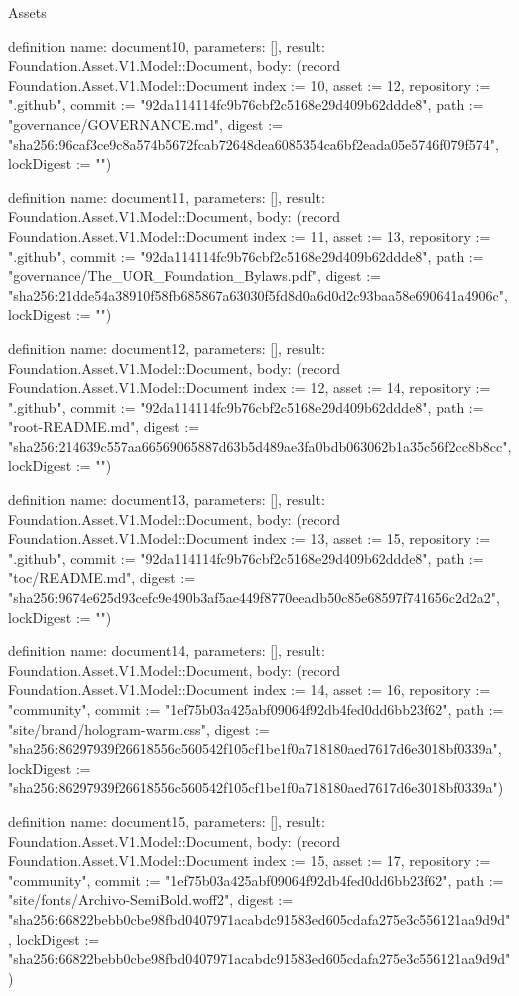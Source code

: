 \begin{lexlean}{Assets}
\begin{semanticmodule}
definition{
  name: document10,
  parameters: [],
  result: Foundation.Asset.V1.Model::Document,
  body: (record Foundation.Asset.V1.Model::Document {index := 10, asset := 12, repository := ".github", commit := "92da114114fc9b76cbf2c5168e29d409b62ddde8", path := "governance/GOVERNANCE.md", digest := "sha256:96caf3ce9c8a574b5672fcab72648dea6085354ca6bf2eada05e5746f079f574", lockDigest := ""})
}

definition{
  name: document11,
  parameters: [],
  result: Foundation.Asset.V1.Model::Document,
  body: (record Foundation.Asset.V1.Model::Document {index := 11, asset := 13, repository := ".github", commit := "92da114114fc9b76cbf2c5168e29d409b62ddde8", path := "governance/The_UOR_Foundation_Bylaws.pdf", digest := "sha256:21dde54a38910f58fb685867a63030f5fd8d0a6d0d2c93baa58e690641a4906c", lockDigest := ""})
}

definition{
  name: document12,
  parameters: [],
  result: Foundation.Asset.V1.Model::Document,
  body: (record Foundation.Asset.V1.Model::Document {index := 12, asset := 14, repository := ".github", commit := "92da114114fc9b76cbf2c5168e29d409b62ddde8", path := "root-README.md", digest := "sha256:214639c557aa66569065887d63b5d489ae3fa0bdb063062b1a35c56f2cc8b8cc", lockDigest := ""})
}

definition{
  name: document13,
  parameters: [],
  result: Foundation.Asset.V1.Model::Document,
  body: (record Foundation.Asset.V1.Model::Document {index := 13, asset := 15, repository := ".github", commit := "92da114114fc9b76cbf2c5168e29d409b62ddde8", path := "toc/README.md", digest := "sha256:9674e625d93cefc9e490b3af5ae449f8770eeadb50c85e68597f741656c2d2a2", lockDigest := ""})
}

definition{
  name: document14,
  parameters: [],
  result: Foundation.Asset.V1.Model::Document,
  body: (record Foundation.Asset.V1.Model::Document {index := 14, asset := 16, repository := "community", commit := "1ef75b03a425abf09064f92db4fed0dd6bb23f62", path := "site/brand/hologram-warm.css", digest := "sha256:86297939f26618556c560542f105cf1be1f0a718180aed7617d6e3018bf0339a", lockDigest := "sha256:86297939f26618556c560542f105cf1be1f0a718180aed7617d6e3018bf0339a"})
}

definition{
  name: document15,
  parameters: [],
  result: Foundation.Asset.V1.Model::Document,
  body: (record Foundation.Asset.V1.Model::Document {index := 15, asset := 17, repository := "community", commit := "1ef75b03a425abf09064f92db4fed0dd6bb23f62", path := "site/fonts/Archivo-SemiBold.woff2", digest := "sha256:66822bebb0cbe98fbd0407971acabdc91583ed605cdafa275e3c556121aa9d9d", lockDigest := "sha256:66822bebb0cbe98fbd0407971acabdc91583ed605cdafa275e3c556121aa9d9d"})
}


\end{semanticmodule}
\end{lexlean}
